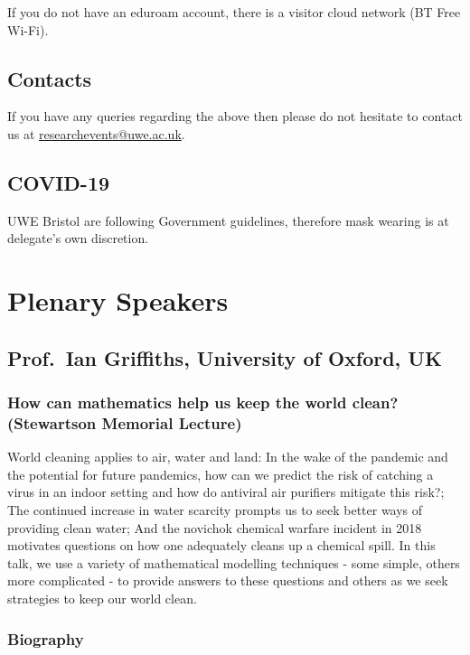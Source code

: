 \documentclass[12pt,a4paper]{article}
\begin{document}
If you do not have an eduroam account, there is a visitor cloud network (BT Free Wi-Fi).

\subsection{Contacts}

If you have any queries regarding the above then please do not hesitate to contact us at \href{mailto:researchevents@uwe.ac.uk}{researchevents@uwe.ac.uk}.

\subsection{COVID-19}

UWE Bristol are following Government guidelines, therefore mask wearing is at delegate's own discretion.

\section{Plenary Speakers}

\subsection{Prof.~Ian Griffiths, University of Oxford, UK}

\subsubsection{How can mathematics help us keep the world clean? (Stewartson Memorial Lecture)}

World cleaning applies to air, water and land: In the wake of the pandemic and the potential for future pandemics, how can we predict the risk of catching a virus in an indoor setting and how do antiviral air purifiers mitigate this risk?; The continued increase in water scarcity prompts us to seek better ways of providing clean water; And the novichok chemical warfare incident in 2018 motivates questions on how one adequately cleans up a chemical spill. In this talk, we use a variety of mathematical modelling techniques - some simple, others more complicated - to provide answers to these questions and others as we seek strategies to keep our world clean.

\subsubsection{Biography}
\end{document}
